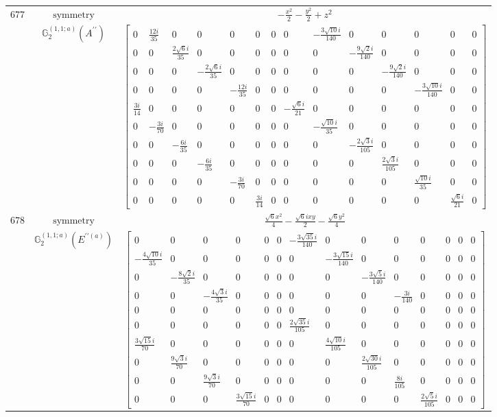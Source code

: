 \documentclass[fleqn,8pt,landscape]{jsarticle}
\begin{document}
\begin{longtable}{ccc}
$ 677 $ & $ \text{symmetry} $ & $ - \frac{x^{2}}{2} - \frac{y^{2}}{2} + z^{2} $ \\
$  $ & $ \mathbb{G}_{2}^{(1,1;a)}(A^{\prime\prime}) $ & $ \begin{bmatrix} 0 & \frac{12 i}{35} & 0 & 0 & 0 & 0 & 0 & 0 & - \frac{3 \sqrt{10} i}{140} & 0 & 0 & 0 & 0 & 0 \\ 0 & 0 & \frac{2 \sqrt{6} i}{35} & 0 & 0 & 0 & 0 & 0 & 0 & - \frac{9 \sqrt{2} i}{140} & 0 & 0 & 0 & 0 \\ 0 & 0 & 0 & - \frac{2 \sqrt{6} i}{35} & 0 & 0 & 0 & 0 & 0 & 0 & - \frac{9 \sqrt{2} i}{140} & 0 & 0 & 0 \\ 0 & 0 & 0 & 0 & - \frac{12 i}{35} & 0 & 0 & 0 & 0 & 0 & 0 & - \frac{3 \sqrt{10} i}{140} & 0 & 0 \\ \frac{3 i}{14} & 0 & 0 & 0 & 0 & 0 & 0 & - \frac{\sqrt{6} i}{21} & 0 & 0 & 0 & 0 & 0 & 0 \\ 0 & - \frac{3 i}{70} & 0 & 0 & 0 & 0 & 0 & 0 & - \frac{\sqrt{10} i}{35} & 0 & 0 & 0 & 0 & 0 \\ 0 & 0 & - \frac{6 i}{35} & 0 & 0 & 0 & 0 & 0 & 0 & - \frac{2 \sqrt{3} i}{105} & 0 & 0 & 0 & 0 \\ 0 & 0 & 0 & - \frac{6 i}{35} & 0 & 0 & 0 & 0 & 0 & 0 & \frac{2 \sqrt{3} i}{105} & 0 & 0 & 0 \\ 0 & 0 & 0 & 0 & - \frac{3 i}{70} & 0 & 0 & 0 & 0 & 0 & 0 & \frac{\sqrt{10} i}{35} & 0 & 0 \\ 0 & 0 & 0 & 0 & 0 & \frac{3 i}{14} & 0 & 0 & 0 & 0 & 0 & 0 & \frac{\sqrt{6} i}{21} & 0 \end{bmatrix} $ \\ \hline
$ 678 $ & $ \text{symmetry} $ & $ \frac{\sqrt{6} x^{2}}{4} - \frac{\sqrt{6} i x y}{2} - \frac{\sqrt{6} y^{2}}{4} $ \\
$  $ & $ \mathbb{G}_{2}^{(1,1;a)}(E^{\prime\prime(a)}) $ & $ \begin{bmatrix} 0 & 0 & 0 & 0 & 0 & 0 & - \frac{3 \sqrt{35} i}{140} & 0 & 0 & 0 & 0 & 0 & 0 & 0 \\ - \frac{4 \sqrt{10} i}{35} & 0 & 0 & 0 & 0 & 0 & 0 & - \frac{3 \sqrt{15} i}{140} & 0 & 0 & 0 & 0 & 0 & 0 \\ 0 & - \frac{8 \sqrt{2} i}{35} & 0 & 0 & 0 & 0 & 0 & 0 & - \frac{3 \sqrt{5} i}{140} & 0 & 0 & 0 & 0 & 0 \\ 0 & 0 & - \frac{4 \sqrt{3} i}{35} & 0 & 0 & 0 & 0 & 0 & 0 & - \frac{3 i}{140} & 0 & 0 & 0 & 0 \\ 0 & 0 & 0 & 0 & 0 & 0 & 0 & 0 & 0 & 0 & 0 & 0 & 0 & 0 \\ 0 & 0 & 0 & 0 & 0 & 0 & \frac{2 \sqrt{35} i}{105} & 0 & 0 & 0 & 0 & 0 & 0 & 0 \\ \frac{3 \sqrt{15} i}{70} & 0 & 0 & 0 & 0 & 0 & 0 & \frac{4 \sqrt{10} i}{105} & 0 & 0 & 0 & 0 & 0 & 0 \\ 0 & \frac{9 \sqrt{3} i}{70} & 0 & 0 & 0 & 0 & 0 & 0 & \frac{2 \sqrt{30} i}{105} & 0 & 0 & 0 & 0 & 0 \\ 0 & 0 & \frac{9 \sqrt{3} i}{70} & 0 & 0 & 0 & 0 & 0 & 0 & \frac{8 i}{105} & 0 & 0 & 0 & 0 \\ 0 & 0 & 0 & \frac{3 \sqrt{15} i}{70} & 0 & 0 & 0 & 0 & 0 & 0 & \frac{2 \sqrt{5} i}{105} & 0 & 0 & 0 \end{bmatrix} $ \\ \hline

\end{longtable}
\end{document}
